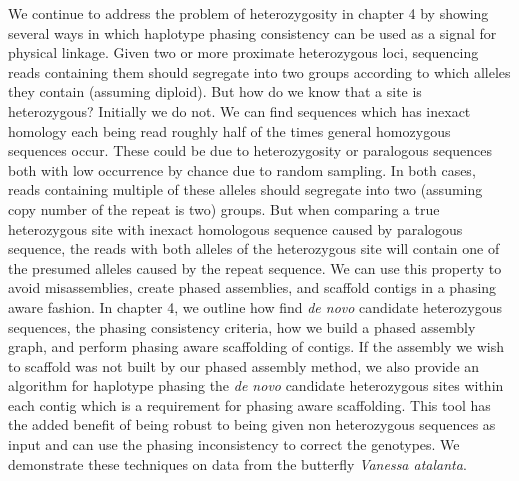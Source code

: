 \par{
We continue to address the problem of heterozygosity in chapter 4 by showing several ways in which haplotype phasing consistency can be used as a signal for physical linkage. Given two or more proximate heterozygous loci, sequencing reads containing them should segregate into two groups according to which alleles they contain (assuming diploid). But how do we know that a site is heterozygous? Initially we do not. We can find sequences which has inexact homology each being read roughly half of the times general homozygous sequences occur. These could be due to heterozygosity or paralogous sequences both with low occurrence by chance due to random sampling. In both cases, reads containing multiple of these alleles should segregate into two (assuming copy number of the repeat is two) groups. But when comparing a true heterozygous site with inexact homologous sequence caused by paralogous sequence, the reads with both alleles of the heterozygous site will contain one of the presumed alleles caused by the repeat sequence. We can use this property to avoid misassemblies, create phased assemblies, and scaffold contigs in a phasing aware fashion. In chapter 4, we outline how find \textit{de novo} candidate heterozygous sequences, the phasing consistency criteria, how we build a phased assembly graph, and perform phasing aware scaffolding of contigs. If the assembly we wish to scaffold was not built by our phased assembly method, we also provide an algorithm for haplotype phasing the \textit{de novo} candidate heterozygous sites within each contig which is a requirement for phasing aware scaffolding. This tool has the added benefit of being robust to being given non heterozygous sequences as input and can use the phasing inconsistency to correct the genotypes. We demonstrate these techniques on data from the butterfly \textit{Vanessa atalanta}.
} 

